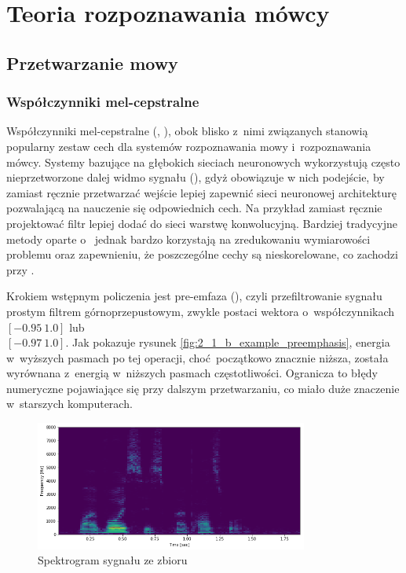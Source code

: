\chapter{Teoria rozpoznawania mówcy}\label{chap:teoria}

\section{Przetwarzanie mowy}\label{sec:przetwarzanie_mowy}

\subsection{Współczynniki mel-cepstralne}\label{sec:mfcc}

Współczynniki mel-cepstralne (, ),
obok blisko z~nimi związanych  stanowią popularny zestaw
cech dla systemów rozpoznawania mowy i~rozpoznawania mówcy. Systemy bazujące na głębokich sieciach
neuronowych wykorzystują często nieprzetworzone dalej widmo sygnału (), gdyż obowiązuje
w nich podejście, by zamiast ręcznie przetwarzać wejście lepiej zapewnić sieci neuronowej
architekturę pozwalającą na nauczenie się odpowiednich cech. Na przykład zamiast ręcznie
projektować filtr lepiej dodać do sieci warstwę konwolucyjną. Bardziej tradycyjne metody
oparte o~ jednak bardzo korzystają na zredukowaniu wymiarowości problemu
oraz zapewnieniu, że poszczególne cechy są nieskorelowane, co zachodzi przy .

Krokiem wstępnym policzenia  jest pre-emfaza (), czyli przefiltrowanie sygnału
prostym filtrem górnoprzepustowym, zwykle postaci wektora o~współczynnikach $[-0.95\ 1.0]$ lub \\ $[-0.97\ 1.0]$.
Jak pokazuje rysunek \ref{fig:2_1_b_example_preemphasis}, energia w~wyższych pasmach po tej operacji,
choć początkowo znacznie niższa, została wyrównana z~energią w~niższych pasmach częstotliwości.
Ogranicza to błędy numeryczne
pojawiające się przy dalszym przetwarzaniu, co miało duże znaczenie w~starszych komputerach.

\begin{figure}[H]
    \centering
    \includegraphics[width=0.8\textwidth]{images/2_1_a_example_spectrogram}
    \caption{Spektrogram sygnału  ze zbioru }
    \label{fig:2_1_a_example_spectrogram}
\end{figure}


